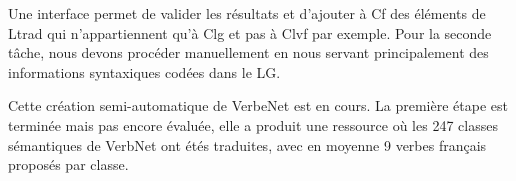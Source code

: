 Une interface permet de valider les résultats et d'ajouter à Cf des éléments de Ltrad qui n'appartiennent qu'à Clg et pas à Clvf par exemple. Pour la seconde tâche, nous devons procéder manuellement en nous servant principalement des informations syntaxiques codées dans le LG.

Cette création semi-automatique de VerbeNet est en cours. La première étape est terminée mais pas encore évaluée, elle a produit une ressource où les 247 classes sémantiques de VerbNet ont étés traduites, avec en moyenne 9 verbes français proposés par classe.

